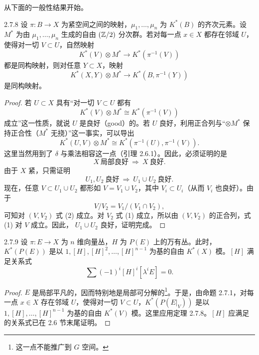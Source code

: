 从下面的一般性结果开始。

\begin{theorem*}{2.7.8}
  设 $\pi\colon B\to X$ 为紧空间之间的映射，$\mu_1,\ldots,\mu_n$ 为 $K^*(B)$ 的齐次元素。设 $M^*$ 为由 $\mu_1,\ldots,\mu_n$ 生成的自由 $(\mathbb{Z}/2)$ 分次群。若对每一点 $x\in X$ 都存在邻域 $U$，使得对一切 $V\subset U$，自然映射
  \[
  K^*(V)\otimes M^*\longrightarrow K^*(\pi^{-1}(V))
  \]
  都是同构映射，则对任意 $Y\subset X$，映射
  \[
  K^*(X,Y)\otimes M^*\longrightarrow K^*(B,\pi^{-1}(Y))
  \]
  是同构映射。
\end{theorem*}

\begin{proof}
  若 $U\subset X$ 具有“对一切 $V\subset U$ 都有
  \begin{equation}
  K^*(V)\otimes M^*\cong K^*(\pi^{-1}(V)) \tag{1}
  \end{equation}
  成立”这一性质，就说 $U$ 是良好（good）的。若 $U$ 良好，利用正合列与“$\otimes M^*$ 保持正合性（$M^*$ 无挠）”这一事实，可以导出
  \begin{equation}
  K^*(U,V)\otimes M^*\cong K^*(\pi^{-1}(U),\pi^{-1}(V)). \tag{2}
  \end{equation}
  这里当然用到了 $\delta$ 与乘法相容这一点（引理 2.6.1）。因此，必须证明的是
  \[
  X\ \text{局部良好}\ \Longrightarrow\ X\ \text{良好}.
  \]
  由于 $X$ 紧，只需证明
  \[
  U_1,U_2\ \text{良好}\ \Longrightarrow\ U_1\cup U_2\ \text{良好}.
  \]
  现在，任意 $V\subset U_1\cup U_2$ 都形如 $V=V_1\cup V_2$，其中 $V_i\subset U_i$（从而 $V_i$ 也良好）。由于
  \[
  V/V_2=V_1/(V_1\cap V_2),
  \]
  可知对 $(V,V_2)$ 式 (2) 成立。对 $V_2$ 式 (1) 成立，所以由 $(V,V_2)$ 的正合列，式 (1) 对 $V$ 成立。因此，
  $U_1\cup U_2$ 良好，证明完成。
\end{proof}


\begin{corollary*}{2.7.9}
  设 $\pi\colon E\to X$ 为 $n$ 维向量丛，$H$ 为 $P(E)$ 上的万有丛。此时，$K^*(P(E))$ 是以 $1,[H],[H]^2,\ldots,[H]^{n-1}$ 为基的自由 $K^*(X)$ 模。$[H]$ 满足关系式
  \[
  \sum(-1)^i[H]^i[\lambda^iE]=0.
  \]
\end{corollary*}

\begin{proof}
  $E$ 是局部平凡的，因而特别地是局部可分解的\footnote{这一点不能推广到 $G$ 空间。}。于是，由命题 2.7.1，对每一点 $x\in X$ 存在邻域 $U$，使得对一切 $V\subset U$，$K^*(P(E|_V))$ 是以 $1,[H],\ldots,[H]^{n-1}$ 为基的自由 $K^*(V)$ 模。这里应用定理 2.7.8。$[H]$ 应满足的关系式已在 2.6 节末尾证明。
\end{proof}

